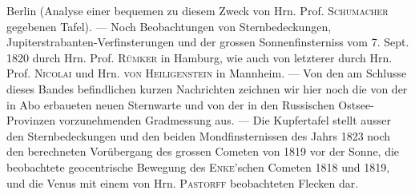 Berlin (Analyse einer bequemen zu diesem Zweck von Hrn. Prof. \textsc{Schumacher} gegebenen Tafel). --- Noch Beobachtungen von Sternbedeckungen, Jupiterstrabanten-Verfinsterungen und der grossen Sonnenfinsterniss vom 7. Sept. 1820 durch Hrn. Prof. \textsc{Rümker} in Hamburg, wie auch von letzterer durch Hrn. Prof. \textsc{Nicolai} und Hrn. \textsc{von Heiligenstein} in Mannheim. --- Von den am Schlusse dieses Bandes befindlichen kurzen Nachrichten zeichnen wir hier noch die von der in Abo erbaueten neuen Sternwarte und von der in den Russischen Ostsee-Provinzen vorzunehmenden Gradmessung aus. --- Die Kupfertafel stellt ausser den Sternbedeckungen und den beiden Mondfinsternissen des Jahrs 1823 noch den berechneten Vorübergang des grossen Cometen von 1819 vor der Sonne, die beobachtete geocentrische Bewegung des \textsc{Enke}'schen Cometen 1818 und 1819, und die Venus mit einem von Hrn. \textsc{Pastorff} beobachteten Flecken dar.
\par\clearpage
\endgroup
